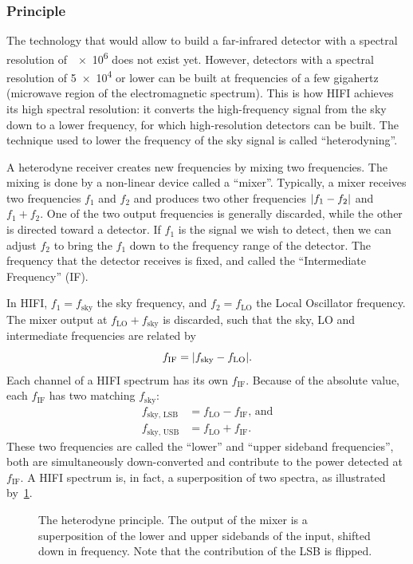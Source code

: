 
\subsubsection{Principle}
The technology that would allow to build a far-infrared detector with a spectral resolution of~\num{e6} does not exist yet.
However, detectors with a spectral resolution of \num{5e4} or lower can be built at frequencies of a few gigahertz (microwave region of the electromagnetic spectrum).
This is how HIFI achieves its high spectral resolution: it converts the high-frequency signal from the sky down to a lower frequency, for which high-resolution detectors can be built.
The technique used to lower the frequency of the sky signal is called ``heterodyning''.

A heterodyne receiver creates new frequencies by mixing two frequencies.
The mixing is done by a non-linear device called a ``mixer''.
Typically, a mixer receives two frequencies $f_1$ and $f_2$ and produces two other frequencies $\abs{f_1-f_2}$ and $f_1+f_2$.
One of the two output frequencies is generally discarded, while the other is directed toward a detector.
If $f_1$ is the signal we wish to detect, then we can adjust $f_2$ to bring the $f_1$ down to the frequency range of the detector.
The frequency that the detector receives is fixed, and called the ``Intermediate Frequency'' (IF).

In HIFI, $f_1=f_\text{sky}$ the sky frequency,
and $f_2=f_\text{LO}$ the Local Oscillator frequency.
The mixer output at $f_\text{LO}+f_\text{sky}$ is discarded, such that
the sky, LO and intermediate frequencies are related by
\begin{equation}
    f_\text{IF} = \abs{f_\text{sky} - f_\text{LO}}\text{.} \label{eq:heterodyne_question}
\end{equation}
Each channel of a HIFI spectrum has its own $f_\text{IF}$.
Because of the absolute value, each $f_\text{IF}$ has two matching $f_\text{sky}$:
\begin{equation}
    \begin{aligned}
        f_\text{sky, LSB} &= f_\text{LO} - f_\text{IF}    \text{, and}    \\
        f_\text{sky, USB} &= f_\text{LO} + f_\text{IF}    \text{.}
    \end{aligned}
    \label{eq:sideband_convolution}
\end{equation}
These two frequencies are called the ``lower'' and ``upper sideband frequencies'', both are simultaneously down-converted and contribute to the power detected at $f_\text{IF}$.
A HIFI spectrum is, in fact, a superposition of two spectra, as illustrated by~\cref{fig:heterodyne_principle}.
\begin{figure}
    \centering
    
    \caption{The heterodyne principle.
        The output of the mixer is a superposition of the lower and upper sidebands of the input, shifted down in frequency.
        Note that the contribution of the LSB is flipped.}
    \label{fig:heterodyne_principle}
\end{figure}

